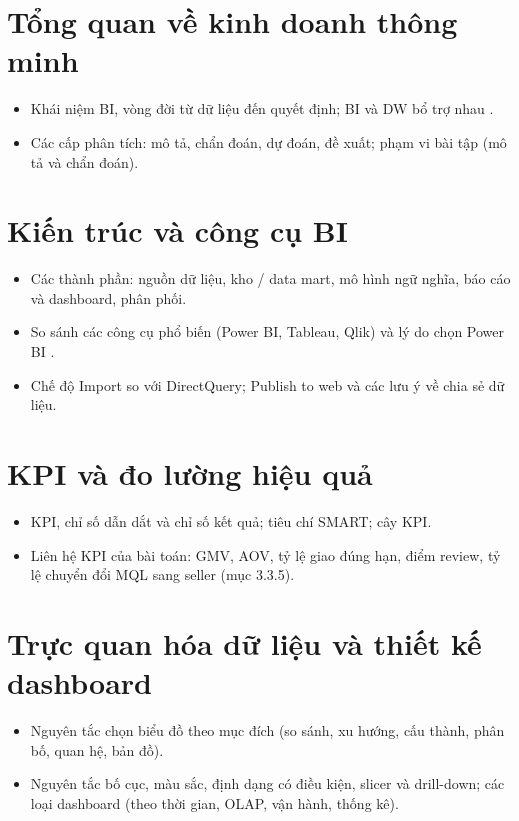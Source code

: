 
\section{Tổng quan về kinh doanh thông minh}
\begin{itemize}
  \item Khái niệm BI, vòng đời từ dữ liệu đến quyết định; BI và DW bổ trợ nhau \cite{kimball2013}.
  \item Các cấp phân tích: mô tả, chẩn đoán, dự đoán, đề xuất; phạm vi bài tập (mô tả và chẩn đoán).
\end{itemize}

\section{Kiến trúc và công cụ BI}
\begin{itemize}
  \item Các thành phần: nguồn dữ liệu, kho / data mart, mô hình ngữ nghĩa, báo cáo và dashboard, phân phối.
  \item So sánh các công cụ phổ biến (Power BI, Tableau, Qlik) và lý do chọn Power BI \cite{powerbi_docs}.
  \item Chế độ Import so với DirectQuery; Publish to web và các lưu ý về chia sẻ dữ liệu.
\end{itemize}

\section{KPI và đo lường hiệu quả}
\begin{itemize}
  \item KPI, chỉ số dẫn dắt và chỉ số kết quả; tiêu chí SMART; cây KPI.
  \item Liên hệ KPI của bài toán: GMV, AOV, tỷ lệ giao đúng hạn, điểm review, tỷ lệ chuyển đổi MQL sang seller (mục 3.3.5).
\end{itemize}

\section{Trực quan hóa dữ liệu và thiết kế dashboard}
\begin{itemize}
  \item Nguyên tắc chọn biểu đồ theo mục đích (so sánh, xu hướng, cấu thành, phân bố, quan hệ, bản đồ).
  \item Nguyên tắc bố cục, màu sắc, định dạng có điều kiện, slicer và drill-down; các loại dashboard (theo thời gian, OLAP, vận hành, thống kê).
\end{itemize}

